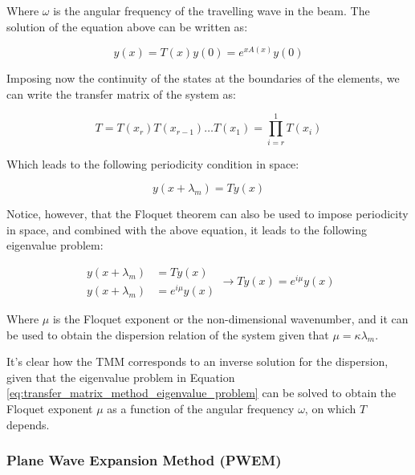 Where $\omega$ is the angular frequency of the travelling wave in the beam.
The solution of the equation above can be written as:

\begin{equation}
    y(x) = T(x) y(0) = e^{x A(x)} y(0)
\end{equation}

Imposing now the continuity of the states at the boundaries of the elements, we can write the transfer matrix of the system as:

\begin{equation}
    T = T(x_r) T(x_{r-1}) \ldots T(x_1) = \prod_{i=r}^{1} T(x_i)
\end{equation}

Which leads to the following periodicity condition in space:

\begin{equation}
    y(x + \lambda_m) = T y(x)
\end{equation}

Notice, however, that the Floquet theorem can also be used to impose periodicity in space, and combined with the above equation, it leads to the following eigenvalue problem:

\begin{equation}
    \begin{aligned}
        y(x + \lambda_m) & = T y(x)         \\
        y(x + \lambda_m) & = e^{i \mu} y(x)
    \end{aligned}
    \rightarrow
    T y(x) = e^{i \mu} y(x)
    \label{eq:transfer_matrix_method_eigenvalue_problem}
\end{equation}

Where $\mu$ is the Floquet exponent or the non-dimensional wavenumber, and it can be used to obtain the dispersion relation of the system given that $\mu = \kappa \lambda_m$.

It's clear how the TMM corresponds to an inverse solution for the dispersion, given that the eigenvalue problem in Equation \ref{eq:transfer_matrix_method_eigenvalue_problem} can be solved to obtain the Floquet exponent $\mu$ as a function of the angular frequency $\omega$, on which $T$ depends.



\subsubsection{Plane Wave Expansion Method (PWEM)}
\label{subsubsec:plane_wave_expansion_method_pwem}

